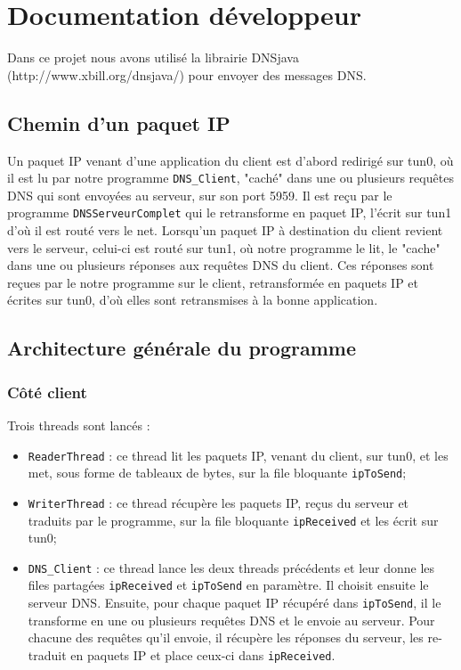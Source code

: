 \documentclass[a4paper,12pt]{article}
\begin{document}
	
\section{Documentation développeur}
	Dans ce projet nous avons utilisé la librairie DNSjava (http://www.xbill.org/dnsjava/) pour envoyer des messages DNS.
	
	\subsection{Chemin d'un paquet IP}
	Un paquet IP venant d'une application du client est d'abord redirigé sur tun0, où il est lu par notre programme \verb?DNS_Client?, "caché" dans une ou plusieurs requêtes DNS qui sont envoyées au serveur, sur son port 5959. Il est reçu par le programme \verb?DNSServeurComplet? qui le retransforme en paquet IP, l'écrit sur tun1 d'où il est routé vers le net. Lorsqu'un paquet IP à destination du client revient vers le serveur, celui-ci est routé sur tun1, où notre programme le lit, le "cache" dans une ou plusieurs réponses aux requêtes DNS du client. Ces réponses sont reçues par le notre programme sur le client, retransformée en paquets IP et écrites sur tun0, d'où elles sont retransmises à la bonne application.
	
	\subsection{Architecture générale du programme}
		\subsubsection{Côté client}
		Trois threads sont lancés :
		\begin{itemize}
			\item \verb?ReaderThread? : ce thread lit les paquets IP, venant du client, sur tun0, et les met, sous forme de tableaux de bytes, sur la file bloquante \verb?ipToSend?;
			\item \verb?WriterThread? : ce thread récupère les paquets IP, reçus du serveur et traduits par le programme, sur la file bloquante \verb?ipReceived? et les écrit sur tun0;
			\item \verb?DNS_Client? : ce thread lance les deux threads précédents et leur donne les files partagées \verb?ipReceived? et \verb?ipToSend? en paramètre. Il choisit ensuite le serveur DNS. Ensuite, pour chaque paquet IP récupéré dans \verb?ipToSend?, il le transforme en une ou plusieurs requêtes DNS et le envoie au serveur. Pour chacune des requêtes qu'il envoie, il récupère les réponses du serveur, les re-traduit en paquets IP et place ceux-ci dans \verb?ipReceived?.
		\end{itemize}
			
\end{document}
